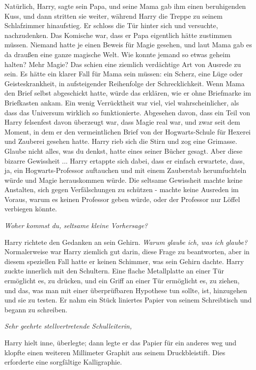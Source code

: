 \glqq{}Natürlich, Harry\grqq{}, sagte sein Papa, und seine Mama gab ihm einen
beruhigenden Kuss, und dann stritten sie weiter, während Harry die Treppe zu
seinem Schlafzimmer hinaufstieg. Er schloss die Tür hinter sich und versuchte,
nachzudenken. Das Komische war, dass er Papa eigentlich hätte zustimmen müssen.
Niemand hatte je einen Beweis für Magie gesehen, und laut Mama gab es da draußen
eine ganze magische Welt. Wie konnte jemand so etwas geheim halten? Mehr Magie?
Das schien eine ziemlich verdächtige Art von Ausrede zu sein. Es hätte ein
klarer Fall für Mama sein müssen: ein Scherz, eine Lüge oder Geisteskrankheit, in
aufsteigender Reihenfolge der Schrecklichkeit. Wenn Mama den Brief selbst
abgeschickt hatte, würde das erklären, wie er ohne Briefmarke im Briefkasten
ankam. Ein wenig Verrücktheit war viel, viel wahrscheinlicher, als dass das
Universum wirklich so funktionierte. Abgesehen davon, dass ein Teil von Harry
felsenfest davon überzeugt war, dass Magie real war, und zwar seit dem Moment,
in dem er den vermeintlichen Brief von der Hogwarts-Schule für Hexerei und
Zauberei gesehen hatte. Harry rieb sich die Stirn und zog eine Grimasse. Glaube
nicht alles, was du denkst, hatte eines seiner Bücher gesagt. Aber diese bizarre
Gewissheit ... Harry ertappte sich dabei, dass er einfach erwartete, dass, ja,
ein Hogwarts-Professor auftauchen und mit einem Zauberstab herumfuchteln würde
und Magie herauskommen würde. Die seltsame Gewissheit machte keine Anstalten,
sich gegen Verfälschungen zu schützen - machte keine Ausreden im Voraus, warum
es keinen Professor geben würde, oder der Professor nur Löffel verbiegen könnte.

\emph{Woher kommst du, seltsame kleine Vorhersage?}

Harry richtete den Gedanken an sein Gehirn. \emph{Warum glaube ich, was ich
glaube?} Normalerweise war Harry ziemlich gut darin, diese Frage zu beantworten,
aber in diesem speziellen Fall hatte er keinen Schimmer, was sein Gehirn dachte.
Harry zuckte innerlich mit den Schultern. Eine flache Metallplatte an einer Tür
ermöglicht es, zu drücken, und ein Griff an einer Tür ermöglicht es, zu ziehen,
und das, was man mit einer überprüfbaren Hypothese tun sollte, ist, hinzugehen
und sie zu testen. Er nahm ein Stück liniertes Papier von seinem Schreibtisch
und begann zu schreiben.

\emph{Sehr geehrte stellvertretende Schulleiterin,}

Harry hielt inne, überlegte; dann legte er das Papier für ein anderes weg und
klopfte einen weiteren Millimeter Graphit aus seinem Druckbleistift. Dies
erforderte eine sorgfältige Kalligraphie.

